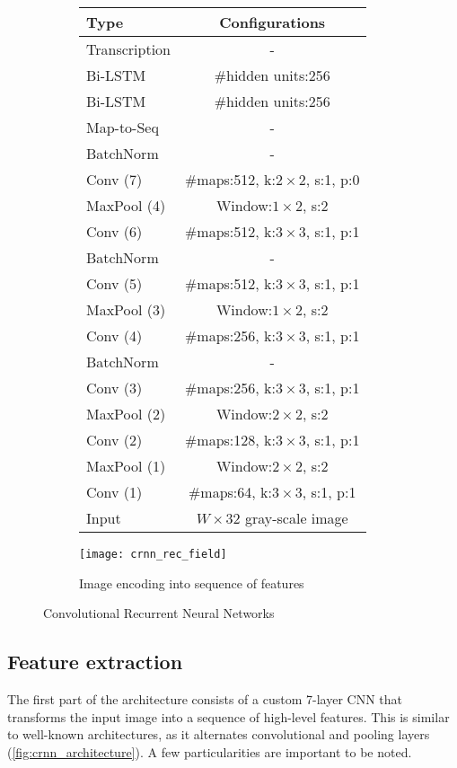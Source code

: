 		\begin{figure}
		\begin{subfigure}[c]{.48\linewidth}
		\begin{flushleft}
		\footnotesize
		\begin{tabular}{|l|c|}
			\hline
			\textbf{Type} & \textbf{Configurations}						\tabularnewline	\hline
																																				\hline
			Transcription & - 																\tabularnewline	\hline
			Bi-LSTM & \#hidden units:256						\tabularnewline	\hline
			Bi-LSTM & \#hidden units:256						\tabularnewline	\hline
			Map-to-Seq & - 															\tabularnewline	\hline
			BatchNorm & - 														\tabularnewline	\hline
			Conv (7) & \#maps:512, k:$2\times2$, s:1, p:0	\tabularnewline	\hline
			MaxPool (4) & Window:$1\times2$, s:2								\tabularnewline	\hline
			Conv (6) & \#maps:512, k:$3\times3$, s:1, p:1	\tabularnewline	\hline
			BatchNorm & - 														\tabularnewline	\hline
			Conv (5) & \#maps:512, k:$3\times3$, s:1, p:1	\tabularnewline	\hline
			MaxPool (3) & Window:$1\times2$, s:2 							\tabularnewline	\hline
			Conv (4) & \#maps:256, k:$3\times3$, s:1, p:1	\tabularnewline	\hline
			BatchNorm & - 														\tabularnewline	\hline
			Conv (3) & \#maps:256, k:$3\times3$, s:1, p:1	\tabularnewline	\hline
			MaxPool (2) & Window:$2\times2$, s:2								\tabularnewline	\hline
			Conv (2) & \#maps:128, k:$3\times3$, s:1, p:1	\tabularnewline	\hline
			MaxPool (1) & Window:$2\times2$, s:2 							\tabularnewline	\hline
			Conv (1) & \#maps:64, k:$3\times3$, s:1, p:1		\tabularnewline	\hline
			Input & $W\times32$ gray-scale image 							\tabularnewline	\hline
		\end{tabular}\par
		\caption[\CRNN{} structure]{}\label{fig:crnn_architecture}
		\end{flushleft}
		\end{subfigure}
		\begin{subfigure}[c]{.49\linewidth}
			\texttt{[image: crnn\_rec\_field]}
			\caption{Image encoding into sequence of features \citep[credit to][]{CRNN}}\label{fig:crnn_sequence}
		\end{subfigure}
		\caption{Convolutional Recurrent Neural Networks}
		\end{figure}

	\subsection{Feature extraction}
		The first part of the \CRNN{} architecture consists of a custom 7-layer CNN that transforms the input image into a sequence of high-level features. This is similar to well-known architectures, as it alternates convolutional and pooling layers (\autoref{fig:crnn_architecture}). A few particularities are important to be noted.

